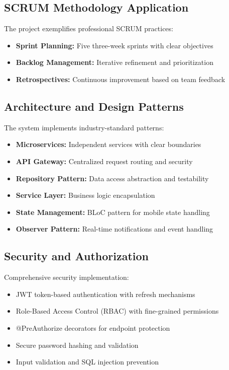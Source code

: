 \subsection*{SCRUM Methodology Application}

The project exemplifies professional SCRUM practices:

\begin{itemize}
\item \textbf{Sprint Planning:} Five three-week sprints with clear objectives
\item \textbf{Backlog Management:} Iterative refinement and prioritization
\item \textbf{Retrospectives:} Continuous improvement based on team feedback
\end{itemize}

\subsection*{Architecture and Design Patterns}

The system implements industry-standard patterns:

\begin{itemize}
\item \textbf{Microservices:} Independent services with clear boundaries
\item \textbf{API Gateway:} Centralized request routing and security
\item \textbf{Repository Pattern:} Data access abstraction and testability
\item \textbf{Service Layer:} Business logic encapsulation
\item \textbf{State Management:} BLoC pattern for mobile state handling
\item \textbf{Observer Pattern:} Real-time notifications and event handling
\end{itemize}

\subsection*{Security and Authorization}

Comprehensive security implementation:

\begin{itemize}
\item JWT token-based authentication with refresh mechanisms
\item Role-Based Access Control (RBAC) with fine-grained permissions
\item @PreAuthorize decorators for endpoint protection
\item Secure password hashing and validation
\item Input validation and SQL injection prevention
\end{itemize}

